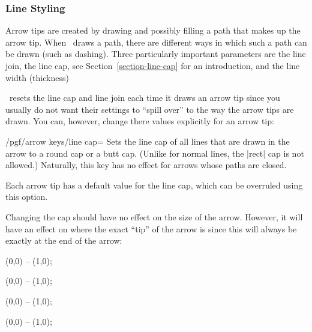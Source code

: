 \subsubsection{Line Styling}
\label{section-arrow-key-caps}

Arrow tips are created by drawing and possibly filling a path that
makes up the arrow tip. When \tikzname\ draws a path, there are
different ways in which such a path can be drawn (such as
dashing). Three particularly important parameters are the line join,
the line cap, see Section~\ref{section-line-cap} for an introduction,
and the line width (thickness) 

\tikzname\ resets the line cap and line join each time it draws an
arrow tip since you usually do not want their settings to ``spill
over'' to the way the arrow tips are drawn. You can, however, change
there values explicitly for an arrow tip:

\begin{key}{/pgf/arrow keys/line cap=}
  Sets the line cap of all lines that are drawn in the arrow to a
  round cap or a butt cap. (Unlike for normal lines, the |rect| cap is
  not allowed.) Naturally, this key has no effect for arrows whose
  paths are closed.

  Each arrow tip has a default value for the line cap, which can
  be overruled using this option.

  Changing the cap should have no effect on the size of the
  arrow. However, it will have an effect on where the exact ``tip'' of
  the arrow is since this will always be exactly at the end of the
  arrow:
\begin{codeexample}[width=3cm]
\tikz [line width=2mm]
  \draw [arrows = {-Computer Modern Rightarrow[line cap=butt]}]
        (0,0) -- (1,0);
\end{codeexample}
\begin{codeexample}[width=3cm]
\tikz [line width=2mm]
  \draw [arrows = {-Computer Modern Rightarrow[line cap=round]}]
        (0,0) -- (1,0);
\end{codeexample}
\begin{codeexample}[width=3cm]
\tikz [line width=2mm]
  \draw [arrows = {-Bracket[reversed,line cap=butt]}]
        (0,0) -- (1,0);
\end{codeexample}
\begin{codeexample}[width=3cm]
\tikz [line width=2mm]
  \draw [arrows = {-Bracket[reversed,line cap=round]}]
        (0,0) -- (1,0);
\end{codeexample}
\end{key}

